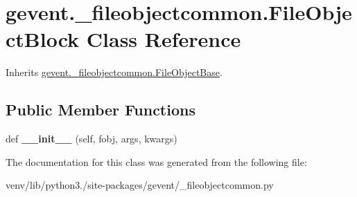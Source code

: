 \hypertarget{classgevent_1_1__fileobjectcommon_1_1_file_object_block}{}\section{gevent.\+\_\+fileobjectcommon.\+File\+Object\+Block Class Reference}
\label{classgevent_1_1__fileobjectcommon_1_1_file_object_block}


Inherits \hyperlink{classgevent_1_1__fileobjectcommon_1_1_file_object_base}{gevent.\+\_\+fileobjectcommon.\+File\+Object\+Base}.

\subsection*{Public Member Functions}
\begin{DoxyCompactItemize}
\item 
\mbox{\label{classgevent_1_1__fileobjectcommon_1_1_file_object_block_a3bb9e3b67b680bbe858069347e829c6d}} 
def {\bfseries \+\_\+\+\_\+init\+\_\+\+\_\+} (self, fobj, args, kwargs)
\end{DoxyCompactItemize}


The documentation for this class was generated from the following file\+:\begin{DoxyCompactItemize}
\item 
venv/lib/python3./site-\/packages/gevent/\+\_\+fileobjectcommon.\+py\end{DoxyCompactItemize}

